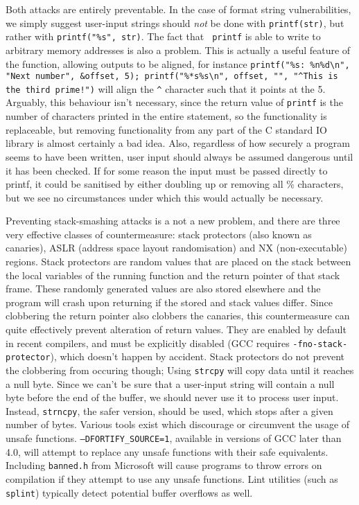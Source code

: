 Both attacks are entirely preventable. In the case of format string vulnerabilities, we simply suggest user-input
strings should \emph{not} be done with {\tt printf(str)}, but rather with {\tt printf("\%s", str)}. The fact that {\tt
printf} is able to write to arbitrary memory addresses is also a problem. This is actually a useful feature of the
function, allowing outputs to be aligned, for instance {\tt printf("\%s: \%n\%d\textbackslash n", "Next number",
\&offset, 5); printf("\%*s\%s\textbackslash n", offset, "", "\textasciicircum This is the third prime!")} will align the
{\tt \textasciicircum} character such that it points at the 5. Arguably, this behaviour isn't necessary, since the
return value of {\tt printf} is the number of characters printed in the entire statement, so the functionality is
replaceable, but removing functionality from any part of the C standard IO library is almost certainly a bad idea. Also,
regardless of how securely a program seems to have been written, user input should always be assumed dangerous until it
has been checked. If for some reason the input must be passed directly to printf, it could be sanitised by either
doubling up or removing all \% characters, but we see no circumstances under which this would actually be necessary.

Preventing stack-smashing attacks is a not a new problem, and there are three very effective classes of countermeasure:
stack protectors (also known as canaries), ASLR (address space layout randomisation) and NX (non-executable) regions.
Stack protectors are random values that are placed on the stack between the local variables of the running function and
the return pointer of that stack frame. These randomly generated values are also stored elsewhere and the program will
crash upon returning if the stored and stack values differ. Since clobbering the return pointer also clobbers the
canaries, this countermeasure can quite effectively prevent alteration of return values. They are enabled by default in
recent compilers, and must be explicitly disabled (GCC requires {\tt -fno-stack-protector}), which doesn't happen by
accident. Stack protectors do not prevent the clobbering from occuring though; Using {\tt strcpy} will copy data until
it reaches a null byte. Since we can't be sure that a user-input string will contain a null byte before the end of the
buffer, we should never use it to process user input. Instead, {\tt strncpy}, the safer version, should be used, which
stops after a given number of bytes. Various tools exist which discourage or circumvent the usage of unsafe functions.
{\tt --DFORTIFY\_SOURCE=1}\cite{fort_source}, available in versions of GCC later than 4.0, will attempt to replace any
unsafe functions with their safe equivalents. Including {\tt banned.h} from Microsoft\cite{banned} will cause programs
to throw errors on compilation if they attempt to use any unsafe functions. Lint utilities (such as {\tt splint})
typically detect potential buffer overflows as well.

